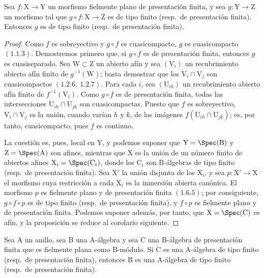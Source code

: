 \begin{proposition}[11.3.16]
\label{IV.11.3.16}
Sea $f:\mathrm{X}\to\mathrm{Y}$ un morfismo fielmente plano de presentación finita, y sea $g:\mathrm{Y}\to\mathrm{Z}$ un morfismo tal que $g\circ f:\mathrm{X}\to\mathrm{Z}$ es de tipo finito (resp.\ de presentación finita). Entonces $g$ es de tipo finito (resp.\ de presentación finita).
\end{proposition}

\begin{proof}
Como $f$ es sobreyectivo y $g\circ f$ es cuasicompacto, $g$ es cuasicompacto $(1.1.3)$. Demostremos primero que, si $g\circ f$ es de presentación finita, entonces $g$ es cuasiseparado. Sea $\mathrm{W}\subset\mathrm{Z}$ un abierto afín y sea $(\mathrm{V}_i)$ un recubrimiento abierto afín finito de $g^{-1}(\mathrm{W})$; basta demostrar que los $\mathrm{V}_i\cap\mathrm{V}_j$ son cuasicompactos $(1.2.6,\ 1.2.7)$. Para cada $i$, sea $(\mathrm{U}_{ih})$ un recubrimiento abierto afín finito de $f^{-1}(\mathrm{V}_i)$. Como $g\circ f$ es de presentación finita, todas las intersecciones $\mathrm{U}_{ih}\cap\mathrm{U}_{jk}$ son cuasicompactas. Puesto que $f$ es sobreyectivo, $\mathrm{V}_i\cap\mathrm{V}_j$ es la unión, cuando varían $h$ y $k$, de las imágenes $f(\mathrm{U}_{ih}\cap\mathrm{U}_{jk})$; es, por tanto, cuasicompacto, pues $f$ es continuo.

La cuestión es, pues, local en $\mathrm{Y}$, y podemos suponer que $\mathrm{Y}=\Spec(\mathrm{B})$ y $\mathrm{Z}=\Spec(\mathrm{A})$ son afines, mientras que $\mathrm{X}$ es la unión de un número finito de abiertos afines $\mathrm{X}_i=\Spec(\mathrm{C}_i)$, donde los $\mathrm{C}_i$ son $\mathrm{B}$-álgebras de tipo finito (resp.\ de presentación finita). Sea $\mathrm{X}'$ la unión disjunta de los $\mathrm{X}_i$, y sea $p:\mathrm{X}'\to\mathrm{X}$ el morfismo cuya restricción a cada $\mathrm{X}_i$ es la inmersión abierta canónica. El morfismo $p$ es fielmente plano y de presentación finita $(1.6.5)$; por consiguiente, $g\circ f\circ p$ es de tipo finito (resp.\ de presentación finita), y $f\circ p$ es fielmente plano y de presentación finita. Podemos suponer además, por tanto, que $\mathrm{X}=\Spec(\mathrm{C})$ es afín, y la proposición se reduce al corolario siguiente.
\end{proof}

\begin{corollary}[11.3.17]
\label{IV.11.3.17}
Sea $\mathrm{A}$ un anillo, sea $\mathrm{B}$ una $\mathrm{A}$-álgebra y sea $\mathrm{C}$ una $\mathrm{B}$-álgebra de presentación finita que es fielmente plana como $\mathrm{B}$-módulo. Si $\mathrm{C}$ es una $\mathrm{A}$-álgebra de tipo finito (resp.\ de presentación finita), entonces $\mathrm{B}$ es una $\mathrm{A}$-álgebra de tipo finito (resp.\ de presentación finita).
\end{corollary}

